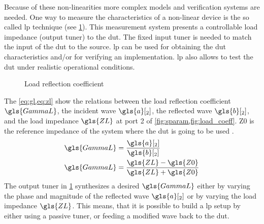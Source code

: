 \documentclass[12pt,a4paper,parskip=full,abstract=true,BCOR=12mm]{scrreprt}
\begin{document}
Because of these non-linearities more complex models and verification systems are
needed. One way to measure the characteristics of a non-linear device is the so called
\gls{lp} technique (see \cref{fig:load_coeff}). This measurement system presents a
controllable load impedance (output tuner) to the \gls{dut}. The fixed input tuner is
needed to match the input of the \gls{dut} to the source. \Gls{lp} can be used for obtaining the
\gls{dut} characteristics and/or for verifying an implementation. \Gls{lp} also
allows to test the \gls{dut} under realistic operational conditions.

\begin{figure}[htb]
    \centering
    \caption{Load reflection coefficient}
    \label{fig:load_coeff}
\end{figure}

The \cref{eq:gl,eq:zl} show the relations between the load reflection coefficient $\gls{GammaL}$,
the incident wave $\gls{a}[_2]$, the reflected
wave $\gls{b}[_2]$, and the load impedance $\gls{ZL}$ at port 2 of \cref{fig:sparam,fig:load_coeff}. \gls{Z0}
is the reference impedance of the system where the \gls{dut} is going to be used \cite{hashmi_highly_2011}.
\begin{align}
    \label{eq:gl} \gls{GammaL} & = \frac{\gls{a}[_2]}{\gls{b}[_2]} \\
    \label{eq:zl} \gls{GammaL} & = \frac{\gls{ZL}-\gls{Z0}}{\gls{ZL}+\gls{Z0}}
\end{align}
The output tuner in \cref{fig:load_coeff} synthesizes a desired $\gls{GammaL}$
either by varying the phase and magnitude of the reflected wave $\gls{a}[_2]$ or by varying
the load impedance $\gls{ZL}$. This means, that it is possible to build a \gls{lp}
setup by either using a passive tuner, or feeding a modified wave back to the
\gls{dut}.
\end{document}
